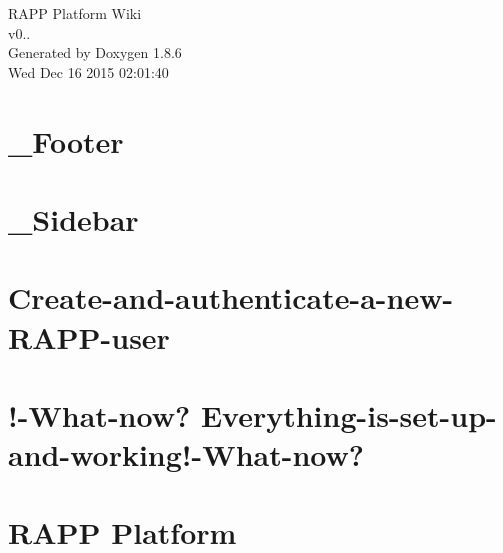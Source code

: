 \documentclass[twoside]{book}
\newcommand{\clearemptydoublepage}{%
  \newpage{\pagestyle{empty}\cleardoublepage}%
}
\begin{document}
\hypersetup{pageanchor=false}
\begin{titlepage}
\vspace*{7cm}
\begin{center}%
{\Large R\-A\-P\-P Platform Wiki \\[1ex]\large v0.. }\\
\vspace*{1cm}
{\large Generated by Doxygen 1.8.6}\\
\vspace*{0.5cm}
{\small Wed Dec 16 2015 02:01:40}\\
\end{center}
\end{titlepage}
\clearemptydoublepage
\tableofcontents
\clearemptydoublepage
{}
\hypersetup{pageanchor=true}

\chapter{\-\_\-\-Footer}
\label{md_rapp-platform_8wiki__Footer}
\hypertarget{md_rapp-platform_8wiki__Footer}{}

\chapter{\-\_\-\-Sidebar}
\label{md_rapp-platform_8wiki__Sidebar}
\hypertarget{md_rapp-platform_8wiki__Sidebar}{}

\chapter{Create-\/and-\/authenticate-\/a-\/new-\/\-R\-A\-P\-P-\/user}
\label{md_rapp-platform_8wiki_Create-and-authenticate-a-new-RAPP-user}
\hypertarget{md_rapp-platform_8wiki_Create-and-authenticate-a-new-RAPP-user}{}

\chapter{!-\/\-What-\/now? Everything-\/is-\/set-\/up-\/and-\/working!-\/\-What-\/now?}
\label{md_rapp-platform_8wiki_Everything-is-set-up-and-working}
\hypertarget{md_rapp-platform_8wiki_Everything-is-set-up-and-working}{}

\chapter{R\-A\-P\-P Platform}
\label{md_rapp-platform_8wiki_Home}
\hypertarget{md_rapp-platform_8wiki_Home}{}

\end{document}
